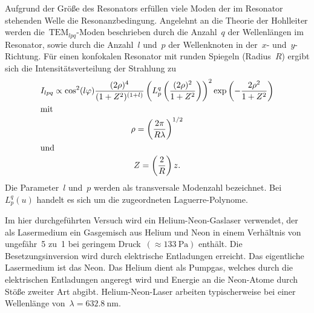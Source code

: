 Aufgrund der Größe des Resonators erfüllen viele Moden der im Resonator
stehenden Welle die Resonanzbedingung. Angelehnt an die Theorie der Hohlleiter
werden die~$\text{TEM}_{lpq}$-Moden beschrieben durch die Anzahl~$q$ der
Wellenlängen im Resonator, sowie durch die Anzahl~$l$ und~$p$ der Wellenknoten
in der~$x$- und~$y$-Richtung. Für einen konfokalen Resonator mit runden Spiegeln
(Radius~$R$) ergibt sich die Intensitätsverteilung der Strahlung zu
%
\begin{gather}
  I_{lpq}\propto\cos^2(l\varphi)\frac{(2\rho)^4}{(1+Z^2)^{(1+l)}}\left(L_p^q\left(\frac{(2\rho)^2}{1+Z^2}\right)\right)^2\exp\left(-\frac{2\rho^2}{1+Z^2}\right) \\
  \shortintertext{mit}
  \rho=\left(\frac{2\pi}{R\lambda}\right)^{1/2} \\
  \shortintertext{und}
  Z=\left(\frac{2}{R}\right)z.
\end{gather}
%
Die Parameter~$l$ und~$p$ werden als transversale Modenzahl bezeichnet.
Bei~$L_p^q(u)$ handelt es sich um die zugeordneten Laguerre-Polynome.

Im hier durchgeführten Versuch wird ein Helium-Neon-Gaslaser verwendet, der als
Lasermedium ein Gasgemisch aus Helium und Neon in einem Verhältnis von
ungefähr~\num{5} zu~\num{1} bei geringem Druck~$(\approx\SI{133}{\pascal})$
enthält. Die Besetzungsinversion wird durch elektrische Entladungen erreicht.
Das eigentliche Lasermedium ist das Neon. Das Helium dient als Pumpgas, welches
durch die elektrischen Entladungen angeregt wird und Energie an die Neon-Atome
durch Stöße zweiter Art abgibt. Helium-Neon-Laser arbeiten typischerweise bei
einer Wellenlänge von~$\lambda=\SI{632.8}{\nano\metre}$.
